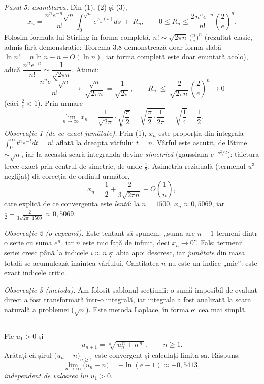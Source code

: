 \emph{Pasul 5: asamblarea.} Din (1), (2) și (3),
\[ x_n=\frac{n^{n}e^{-n}\sqrt n}{n!}\int_0^{\sqrt n}e^{\varphi_n(s)}ds\ +\ R_n,\qquad 0\le R_n\le\frac{2\,n^{n}e^{-n}}{n!}\left(\frac2e\right)^{\!n} . \]
Folosim formula lui Stirling în forma completă, $n!\sim\sqrt{2\pi n}\,\bigl(\frac ne\bigr)^{n}$ (rezultat clasic, admis fără demonstrație: Teorema 3.8 demonstrează doar forma slabă $\ln n!=n\ln n-n+O(\ln n)$, iar forma completă este doar enunțată acolo), adică $\dfrac{n^{n}e^{-n}}{n!}\sim\dfrac{1}{\sqrt{2\pi n}}$. Atunci:
\[ \frac{n^{n}e^{-n}\sqrt n}{n!}\ \longrightarrow\ \frac{\sqrt n}{\sqrt{2\pi n}}=\frac{1}{\sqrt{2\pi}},\qquad R_n\ \le\ \frac{2}{\sqrt{2\pi n}}\left(\frac2e\right)^{\!n}\longrightarrow0 \]
(căci $\frac2e<1$). Prin urmare
\[ \lim_{n\to\infty}x_n=\frac{1}{\sqrt{2\pi}}\cdot\sqrt{\frac\pi2}=\sqrt{\frac{\pi}{2}\cdot\frac{1}{2\pi}}=\sqrt{\frac14}=\frac12 . \]
\emph{Observație 1 (de ce exact jumătate).} Prin (1), $x_n$ este proporția din integrala $\int_0^\infty t^ne^{-t}dt=n!$ aflată la dreapta vârfului $t=n$. Vârful este ascuțit, de lățime $\sim\sqrt n$, iar la această scară integranda devine \emph{simetrică} (gaussiana $e^{-s^{2}/2}$): tăietura trece exact prin centrul de simetrie, de unde $\frac12$. Asimetria reziduală (termenul $u^{3}$ neglijat) dă corecția de ordinul următor,
\[ x_n=\frac12+\frac{2}{3\sqrt{2\pi n}}+O\!\left(\frac1n\right) , \]
care explică de ce convergența este \emph{lentă}: la $n=1500$, $x_n\approx0{,}5069$, iar $\frac12+\frac{2}{3\sqrt{2\pi\cdot1500}}\approx0{,}5069$.

\emph{Observație 2 (o capcană).} Este tentant să spunem: „suma are $n+1$ termeni dintr-o serie cu suma $e^n$, iar $n$ este mic față de infinit, deci $x_n\to0$''. Fals: termenii seriei cresc până la indicele $i\approx n$ și abia apoi descresc, iar \emph{jumătate} din masa totală se acumulează înaintea vârfului. Cantitatea $n$ nu este un indice „mic'': este exact indicele critic.

\emph{Observație 3 (metoda).} Am folosit șablonul secțiunii: o sumă imposibil de evaluat direct a fost transformată într-o integrală, iar integrala a fost analizată la scara naturală a problemei ($\sqrt n$). Este metoda Laplace, în forma ei cea mai simplă.
\vspace{1mm}\hrule

Fie $u_{1}>0$ și
\[ u_{n+1}=\sqrt[n]{\,u_{n}^{\,n}+n^{\,n}\,}\ ,\qquad n\ge1 . \]
Arătați că șirul $\bigl(u_{n}-n\bigr)_{n\ge1}$ este convergent și calculați limita sa.
\sol Răspuns:
\[ \lim_{n\to\infty}\bigl(u_{n}-n\bigr)=-\ln(e-1)\approx-0{,}5413 , \]
\emph{independent de valoarea lui $u_{1}>0$}.

